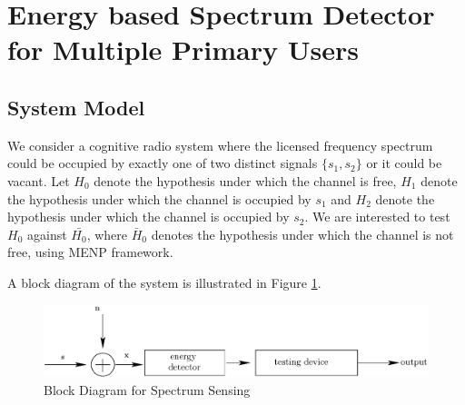 \section{Energy based Spectrum Detector for Multiple Primary Users}
\subsection{System Model}
We consider a cognitive radio system where the licensed frequency spectrum could be occupied by exactly one of two distinct signals $\{s_1, s_2\}$ or it could be vacant. Let $H_0$ denote the hypothesis under which the channel is free, ${H}_1$ denote the hypothesis under which the channel is occupied by $s_1$ and ${H}_2$ denote the hypothesis under which the channel is occupied by $s_2$. We are interested to test $H_0$ against $\bar{{H}_0}$, where $\bar{H}_0$ denotes the hypothesis under which the channel is not free, using MENP framework.

A block diagram of the system is illustrated in Figure \ref{pic: block diagram}.

\begin{figure}[!hbp]
\centering
\includegraphics[width = \textwidth]{4/fig4.eps}
\caption{Block Diagram for Spectrum Sensing}
\label{pic: block diagram}
\end{figure}

